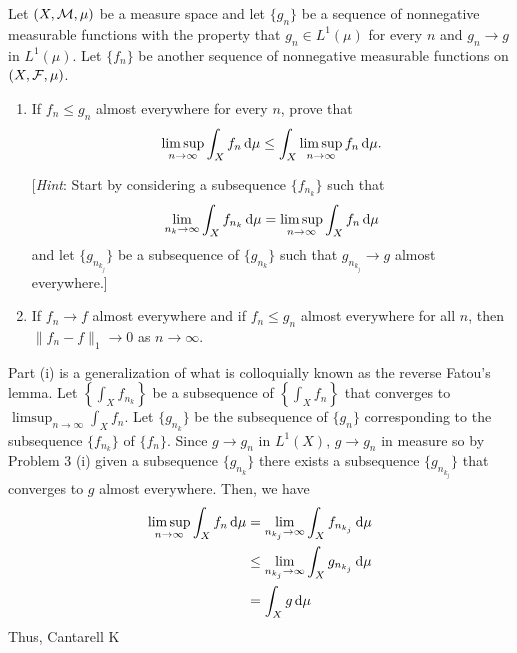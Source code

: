 \begin{problem}
  Let $(X,\mathcal{M},\mu)$ be a measure space and let $\{g_n\}$ be a sequence of
  nonnegative measurable functions with the property that $g_n\in L^1(\mu)$
  for every $n$ and $g_n\to g$ in $L^1(\mu)$. Let $\{f_n\}$ be another
  sequence of nonnegative measurable functions on $(X,\mathcal{F},\mu)$.
  \begin{enumerate}[label=(\roman*),noitemsep]
  \item If $f_n\leq g_n$ almost everywhere for every $n$, prove that
    \[
      \limsup_{n\to\infty}\int_X
      f_n\mathop{}\!\mathrm{d}\mu\leq\int_X\limsup_{n\to\infty}f_n\mathop{}\!\mathrm{d}\mu.
    \]

    [\emph{Hint}: Start by considering a subsequence $\{f_{n_k}\}$ such
    that
    \[
      \lim_{n_k\to\infty}\int_X
      f_{n_k}\mathop{}\!\mathrm{d}\mu=\limsup_{n\to\infty}\int_X f_n\mathop{}\!\mathrm{d}\mu
    \]
    and let $\{g_{n_{k_j}}\}$ be a subsequence of $\{g_{n_k}\}$ such
    that $g_{n_{k_j}}\to g$ almost everywhere.]
  \item If $f_n\to f$ almost everywhere and if $f_n\leq g_n$ almost
    everywhere for all $n$, then $\|f_n-f\|_1\to 0$ as $n\to\infty$.
  \end{enumerate}
\end{problem}
\begin{solution}
  Part (i) is a generalization of what is colloquially known as the reverse
  Fatou's lemma. Let $\left\{\int_X f_{n_k}\right\}$ be a subsequence of
  $\left\{\int_X f_n\right\}$ that converges to
  $\limsup_{n\to\infty}\int_X f_n$. Let $\{g_{n_k}\}$ be the subsequence of
  $\{g_n\}$ corresponding to the subsequence $\{f_{n_k}\}$ of
  $\{f_n\}$. Since $g\to g_n$ in $L^1(X)$, $g\to g_n$ in measure so by
  Problem 3 (i) given a subsequence $\{g_{n_k}\}$ there exists a
  subsequence $\{g_{n_{k_j}}\}$ that converges to $g$ almost
  everywhere. Then, we have
  \begin{align*}
    \limsup_{n\to\infty}\int_X f_n\diff\mu%
    &=\lim_{n_{k_j}\to\infty}\int_X f_{n_{k_j}}\diff\mu\\
    &\leq\lim_{n_{k_j}\to\infty}\int_X g_{n_{k_j}}\diff\mu\\
    &=\int_X g\diff\mu
  \end{align*}
  Thus, \textsf{Cantarell} \textsf{K}
\end{solution}

